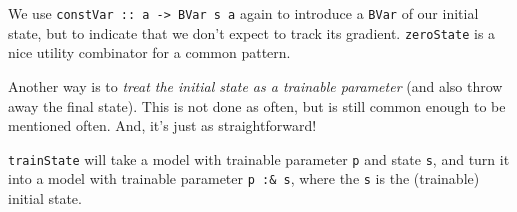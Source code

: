 \documentclass[]{article}
\newenvironment{Shaded}{}{}
\newcommand{\CommentTok}[1]{\textcolor[rgb]{0.38,0.63,0.69}{\textit{#1}}}
\newcommand{\DataTypeTok}[1]{\textcolor[rgb]{0.56,0.13,0.00}{#1}}
\newcommand{\DecValTok}[1]{\textcolor[rgb]{0.25,0.63,0.44}{#1}}
\newcommand{\FunctionTok}[1]{\textcolor[rgb]{0.02,0.16,0.49}{#1}}
\newcommand{\KeywordTok}[1]{\textcolor[rgb]{0.00,0.44,0.13}{\textbf{#1}}}
\newcommand{\NormalTok}[1]{#1}
\newcommand{\OtherTok}[1]{\textcolor[rgb]{0.00,0.44,0.13}{#1}}
\begin{document}
\begin{Shaded}
\end{Shaded}

We use \texttt{constVar\ ::\ a\ -\textgreater{}\ BVar\ s\ a} again to introduce
a \texttt{BVar} of our initial state, but to indicate that we don't expect to
track its gradient. \texttt{zeroState} is a nice utility combinator for a common
pattern.

Another way is to \emph{treat the initial state as a trainable parameter} (and
also throw away the final state). This is not done as often, but is still common
enough to be mentioned often. And, it's just as straightforward!

\begin{Shaded}
\end{Shaded}

\texttt{trainState} will take a model with trainable parameter \texttt{p} and
state \texttt{s}, and turn it into a model with trainable parameter
\texttt{p\ :\&\ s}, where the \texttt{s} is the (trainable) initial state.
\end{document}
